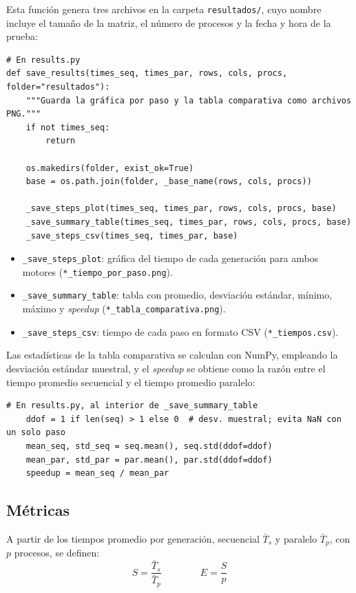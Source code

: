 \documentclass{article}
\begin{document}
Esta función genera tres archivos en la carpeta \verb|resultados/|, cuyo nombre incluye el tamaño de la matriz, el número de procesos y la fecha y hora de la prueba:
\begin{verbatim}
# En results.py
def save_results(times_seq, times_par, rows, cols, procs, folder="resultados"):
    """Guarda la gráfica por paso y la tabla comparativa como archivos PNG."""
    if not times_seq:
        return

    os.makedirs(folder, exist_ok=True)
    base = os.path.join(folder, _base_name(rows, cols, procs))

    _save_steps_plot(times_seq, times_par, rows, cols, procs, base)
    _save_summary_table(times_seq, times_par, rows, cols, procs, base)
    _save_steps_csv(times_seq, times_par, base)
\end{verbatim}

\begin{itemize}
    \item \verb|_save_steps_plot|: gráfica del tiempo de cada generación para ambos motores (\verb|*_tiempo_por_paso.png|).
    \item \verb|_save_summary_table|: tabla con promedio, desviación estándar, mínimo, máximo y \textit{speedup} (\verb|*_tabla_comparativa.png|).
    \item \verb|_save_steps_csv|: tiempo de cada paso en formato CSV (\verb|*_tiempos.csv|).
\end{itemize}

Las estadísticas de la tabla comparativa se calculan con NumPy, empleando la desviación estándar muestral, y el \textit{speedup} se obtiene como la razón entre el tiempo promedio secuencial y el tiempo promedio paralelo:
\begin{verbatim}
# En results.py, al interior de _save_summary_table
    ddof = 1 if len(seq) > 1 else 0  # desv. muestral; evita NaN con un solo paso
    mean_seq, std_seq = seq.mean(), seq.std(ddof=ddof)
    mean_par, std_par = par.mean(), par.std(ddof=ddof)
    speedup = mean_seq / mean_par
\end{verbatim}

\subsection{Métricas}
A partir de los tiempos promedio por generación, secuencial $\bar{T}_{s}$ y paralelo $\bar{T}_{p}$, con $p$ procesos, se definen:
\begin{equation*}
    S = \frac{\bar{T}_{s}}{\bar{T}_{p}} \qquad\qquad E = \frac{S}{p}
\end{equation*}
\end{document}
